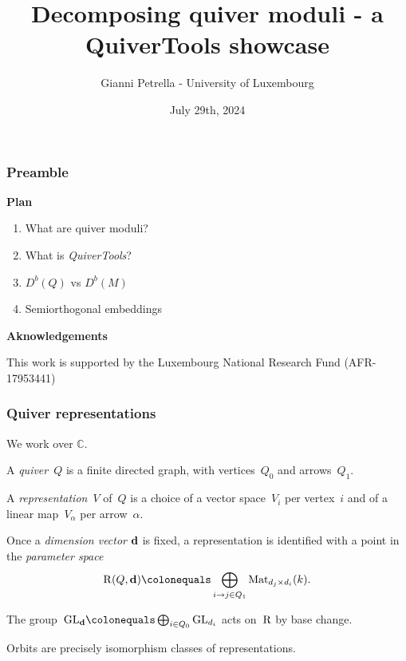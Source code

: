 \documentclass{beamer}
\title{Decomposing quiver moduli - a QuiverTools showcase}
\author{Gianni Petrella - University of Luxembourg}
\institute{MEGA 2024 - MPI MIS Leipzig}
\date{July 29th, 2024}
\begin{document}
\begin{frame}
    \titlepage
\end{frame}

\begin{frame}
    \frametitle{Preamble}
\textbf{Plan}
\begin{enumerate}
    \item What are quiver moduli?
    \item What is \emph{QuiverTools}?
    \item $D^b(Q)$ vs $D^b(M)$
    \item Semiorthogonal embeddings
\end{enumerate} \pause
\vfill
\textbf{Aknowledgements}

This work is supported by the Luxembourg National Research Fund (AFR-17953441)

\end{frame}

\begin{frame}
    \frametitle{Quiver representations}
\begin{definition}
    We work over $\mathbb{C}$. \pause

    A \emph{quiver}~$Q$ is a finite directed graph, with
    vertices~$Q_0$ and arrows~$Q_1$.

    A \emph{representation}~$V$ of~$Q$ is
    a choice of a vector space~$V_i$ per vertex~$i$
    and of a linear map~$V_{\alpha}$ per arrow~$\alpha$.
\end{definition} \pause

Once a \emph{dimension vector} $\mathbf{d}$ is fixed, a representation
is identified with a point in the \emph{parameter space}
\[
    \parameterspace(Q, \tuple{d})
    \colonequals \bigoplus_{i \to j \in Q_1}
    \Mat_{d_j \times d_i}(k).
\] \pause

The group~${\GL}_{\tuple{d}} \colonequals \bigoplus_{i \in Q_0} \GL_{d_i}$
acts on~$\operatorname{R}$ by base change. \pause

Orbits are precisely isomorphism classes of representations.
\end{frame}
\end{document}
